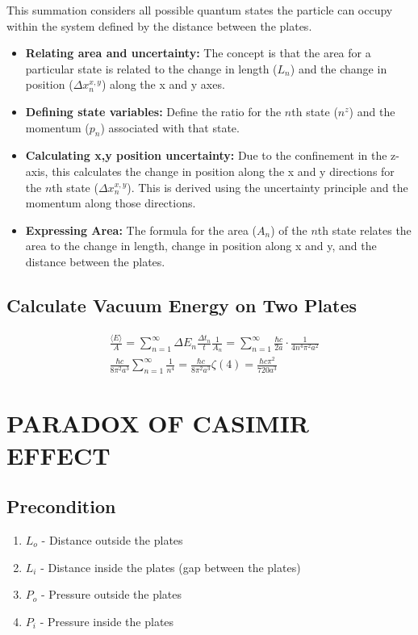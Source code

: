 \documentclass[aip,apl,amsmath,amssymb,reprint]{revtex4-2}
\begin{document}
This summation considers all possible quantum states the particle can occupy within the system 
defined by the distance between the plates.
\begin{itemize}
    \item \textbf{Relating area and uncertainty:} The concept is that the area for a particular state is related to 
    the change in length ($L_n$) and the change in position ($\Delta x_n^{x,y}$) along the x and y axes.
    \item \textbf{Defining state variables:} Define the ratio for the $n$th state ($n^z$) 
    and the momentum ($p_n$) associated with that state.
    \item \textbf{Calculating x,y position uncertainty:} Due to the confinement in the z-axis, 
    this calculates the change in position along the x and y directions for the $n$th state ($\Delta x_n^{x,y}$). 
    This is derived using the uncertainty principle and the momentum along those directions.
    \item \textbf{Expressing Area:} The formula for the area ($A_n$) of the $n$th state relates the area to the change in length, 
    change in position along x and y, and the distance between the plates.
    \end{itemize}
\subsection*{Calculate Vacuum Energy on Two Plates}
\begin{align}
    &\frac{\langle E \rangle}{A} = \sum_{n=1}^{\infty}\Delta E_n\frac{\Delta t_n}{t}\frac{1}{A_n} = \sum_{n=1}^{\infty} \frac{\hbar c }{2 a} \cdot \frac{1}{4 n^4 \pi^2 a^2} \nonumber \\
    &\frac{\hbar c}{8 \pi^2 a^3} \sum_{n=1}^{\infty} \frac{1}{n^4} = \frac{\hbar c}{8 \pi^2 a^3} \zeta(4) = \frac{\hbar c \pi^2}{720 a^3}
\end{align}


\section{PARADOX OF CASIMIR EFFECT}


\subsection*{Precondition}
\begin{enumerate}
    \item \(L_o\) - Distance outside the plates
    \item \(L_i\) - Distance inside the plates (gap between the plates)
    \item \(P_o\) - Pressure outside the plates
    \item \(P_i\) - Pressure inside the plates
\end{enumerate}
\end{document}
